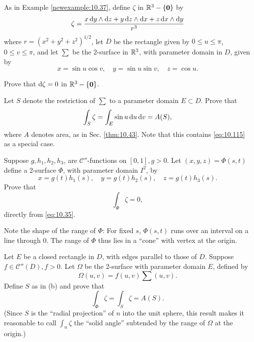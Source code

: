 \begin{myexercise}
    \label{ex:10.22}
    As in Example \ref{newexample:10.37}, define $\zeta$ in ${\protect\mathbb R}^3 - \{\mathbf{0}\}$ by
    \begin{equation*}
        \zeta =
        \frac{
            x \d y \wedge \d z +
            y \d z \wedge \d x +
            z \d x \wedge \d y
        }{r^3}
    \end{equation*}
    where $r = \left( x^2+y^2+z^2 \right)^{1/2}$,
    let $D$ be the rectangle given by
    $0 \leq u \leq \pi$,
    $0 \leq v \leq \pi$,
    and let $\sum$ be the 2-surface in ${\protect\mathbb R}^3$,
    with parameter domain in $D$, given by
    \begin{equation*}
        x = \sin u \cos v, \quad
        y = \sin u \sin v, \quad
        z = \cos u .
    \end{equation*}
    \begin{asparaenum}[(a)]
        \item Prove that $\d \zeta = 0$ in ${\protect\mathbb R}^3 - \{\mathbf{0}\}$.
        \item Let $S$ denote the restriction of $\sum$ to a parameter domain $E \subset D$.
        Prove that
        \begin{equation*}
            \int_S \zeta = \int_E \sin u \d u \d v = A(S),
        \end{equation*}
        where $A$ denotes area, as in Sec. \ref{thm:10.43}.
        Note that this contains \eqref{eq:10.115} as a special case.
        \item Suppose $g, h_1, h_2, h_3$, are $\mathscr{C}''$-functions on $[0, 1], g > 0$.
        Let $(x, y, z) = \Phi(s, t)$
        define a 2-surface $\Phi$, with parameter domain $I^2$, by
        \begin{equation*}
            x = g(t)h_1(s) , \quad
            y = g(t)h_2(s) , \quad
            z = g(t)h_3(s) .
        \end{equation*}
        Prove that
        \begin{equation*}
            \int_{\Phi} \zeta = 0 ,
        \end{equation*}
        directly from \eqref{eq:10.35}.

        Note the shape of the range of $\Phi$:
        For fixed $s$, $\Phi(s, t)$ runs over an interval on a line through 0.
        The range of $\Phi$ thus lies in a ``cone'' with vertex at the origin.
        \item Let $E$ be a closed rectangle in $D$, with edges parallel to those of $D$.
        Suppose $f \in \mathscr{C}''(D), f> 0$.
        Let $\Omega$ be the 2-surface with parameter domain $E$, defined by
        \begin{equation*}
            \Omega(u,v) = f(u,v)\sum(u,v).
        \end{equation*}
        Define $S$ as in (b) and prove that
        \begin{equation*}
            \int_{\Phi} \zeta =  \int_{S} \zeta = A(S).
        \end{equation*}
        (Since $S$ is the ``radial projection'' of $n$ into the unit sphere, this result makes it reasonable to call $\int_n \zeta$ the ``solid angle'' subtended by the range of $\Omega$ at the origin.)


\end{asparaenum}
\end{myexercise}
